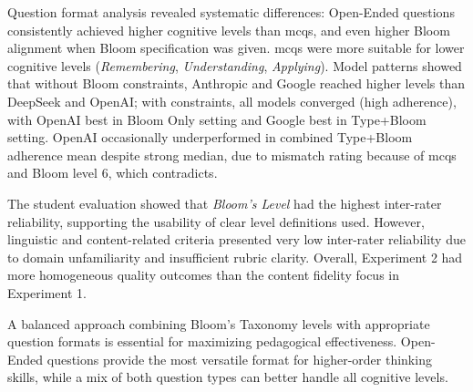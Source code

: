 Question format analysis revealed systematic differences: Open-Ended questions consistently achieved higher cognitive levels than \acp{mcq}, and even higher Bloom alignment when Bloom specification was given. \acp{mcq} were more suitable for lower cognitive levels (\textit{Remembering}, \textit{Understanding}, \textit{Applying}). Model patterns showed that without Bloom constraints, Anthropic and Google reached higher levels than DeepSeek and OpenAI; with constraints, all models converged (high adherence), with OpenAI best in Bloom Only setting and Google best in Type+Bloom setting. OpenAI occasionally underperformed in combined Type+Bloom adherence mean despite strong median, due to mismatch rating because of \acp{mcq} and Bloom level 6, which contradicts.

The student evaluation showed that \textit{Bloom's Level} had the highest inter-rater reliability, supporting the usability of clear level definitions used. However, linguistic and content-related criteria presented very low inter-rater reliability due to domain unfamiliarity and insufficient rubric clarity. Overall, Experiment 2 had more homogeneous quality outcomes than the content fidelity focus in Experiment 1.

A balanced approach combining Bloom's Taxonomy levels with appropriate question formats is essential for maximizing pedagogical effectiveness. Open-Ended questions provide the most versatile format for higher-order thinking skills, while a mix of both question types can better handle all cognitive levels.



